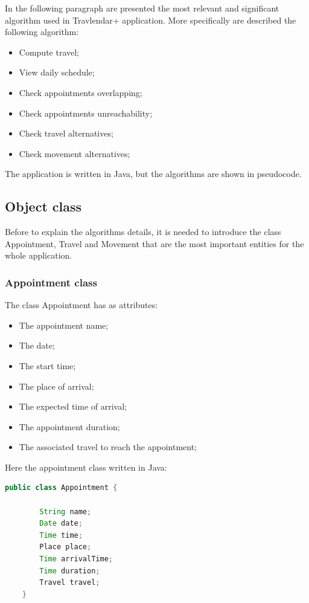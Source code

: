In the following paragraph are presented the most relevant and significant algorithm used in Travlendar+ application.
More specifically are described the following algorithm:
\begin{itemize}
	\item Compute travel;
	\item View daily schedule;
	\item Check appointments overlapping;
	\item Check appointments unreachability;
	\item Check travel alternatives;
	\item Check movement alternatives;
\end{itemize}

The application is written in Java, but the algorithms are shown in pseudocode.

\subsection{Object class}

Before to explain the algorithms details, it is needed to introduce the class Appointment, Travel and Movement that are the most important entities for the whole application.

\subsubsection{Appointment class}

The class Appointment has as attributes:
\begin{itemize}
	\item The appointment name;
	\item The date;
	\item The start time;
	\item The place of arrival;
	\item The expected time of arrival;
	\item The appointment duration;
	\item The associated travel to reach the appointment;
\end{itemize}

Here the appointment class written in Java:
\begin{lstlisting}[language=Java]
	public class Appointment {
	
		String name;
		Date date;
		Time time;
		Place place;
		Time arrivalTime;
		Time duration;
		Travel travel;
	}
		
\end{lstlisting}

